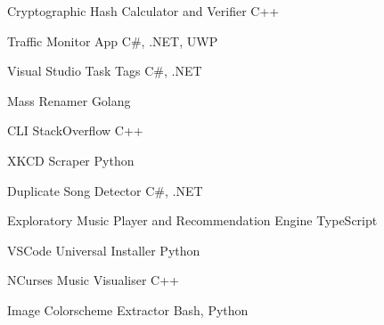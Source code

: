 
\begin{projentries}

\projentry%
  {Cryptographic Hash Calculator and Verifier} %
  {C++} %
  {} %
  {}

\projentry%
  {Traffic Monitor App} %
  {C\#, .NET, UWP} %
  {} %
  {}

\projentry%
  {Visual Studio Task Tags} %
  {C\#, .NET} %
  {} %
  {}

\projentry%
  {Mass Renamer} %
  {Golang} %
  {} %
  {}

\projentry%
  {CLI StackOverflow} %
  {C++} %
  {} %
  {}

\projentry%
  {XKCD Scraper} %
  {Python} %
  {} %
  {}

\projentry%
  {Duplicate Song Detector} %
  {C\#, .NET} %
  {} %
  {}

\projentry%
  {Exploratory Music Player and Recommendation Engine} %
  {TypeScript} %
  {} %
  {}

\projentry%
  {VSCode Universal Installer} %
  {Python} %
  {} %
  {}

\projentry%
  {NCurses Music Visualiser} %
  {C++} %
  {} %
  {}

\projentry%
  {Image Colorscheme Extractor} %
  {Bash, Python} %
  {} %
  {}

\end{projentries}

